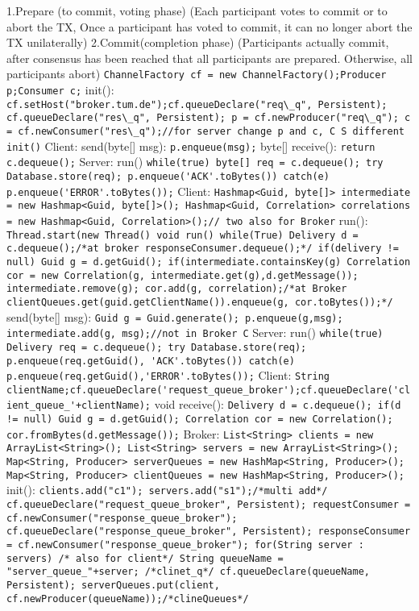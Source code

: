 1.Prepare (to commit, voting phase)
(Each participant votes to commit or to abort the TX,
Once a participant has voted to commit, it can no longer abort the TX unilaterally)
2.Commit(completion phase)
(Participants actually commit, after consensus has been reached that all participants are prepared.
Otherwise, all participants abort)
 \lstinline{ChannelFactory cf = new ChannelFactory();Producer p;Consumer c;}
init():  
\lstinline{cf.setHost("broker.tum.de");cf.queueDeclare("req\_q", Persistent); cf.queueDeclare("res\_q", Persistent); p = cf.newProducer("req\_q"); c = cf.newConsumer("res\_q");//for server change p and c, C S different init()}
 Client: 
send(byte[] msg):
\lstinline{p.enqueue(msg);}
byte[] receive():
\lstinline{return c.dequeue();}
\textbar Server: run()
\lstinline{while(true) byte[] req = c.dequeue(); try Database.store(req); p.enqueue('ACK'.toBytes()) catch(e) p.enqueue('ERROR'.toBytes());}
Client:
\lstinline{Hashmap<Guid, byte[]> intermediate = new Hashmap<Guid, byte[]>(); Hashmap<Guid, Correlation> correlations = new Hashmap<Guid, Correlation>();// two also for Broker}
run():
\lstinline{Thread.start(new Thread() void run() while(True) Delivery d = c.dequeue();/*at broker responseConsumer.dequeue();*/ if(delivery != null) Guid g = d.getGuid(); if(intermediate.containsKey(g) Correlation cor = new Correlation(g, intermediate.get(g),d.getMessage()); intermediate.remove(g); cor.add(g, correlation);/*at Broker clientQueues.get(guid.getClientName()).enqueue(g, cor.toBytes());*/}
send(byte[] msg):
\lstinline{Guid g = Guid.generate(); p.enqueue(g,msg); intermediate.add(g, msg);//not in Broker C}
\textbar Server: run()
\lstinline{while(true) Delivery req = c.dequeue(); try Database.store(req); p.enqueue(req.getGuid(), 'ACK'.toBytes()) catch(e) p.enqueue(req.getGuid(),'ERROR'.toBytes());}
Client: \lstinline{String clientName;cf.queueDeclare('request_queue_broker');cf.queueDeclare('client_queue_'+clientName);}
void receive():
\lstinline{Delivery d = c.dequeue(); if(d != null) Guid g = d.getGuid(); Correlation cor = new Correlation(); cor.fromBytes(d.getMessage());}
\textbar Broker:
\lstinline{List<String> clients = new ArrayList<String>(); List<String> servers = new ArrayList<String>(); Map<String, Producer> serverQueues = new HashMap<String, Producer>(); Map<String, Producer> clientQueues = new HashMap<String, Producer>();}
init():
\lstinline{clients.add("c1"); servers.add("s1");/*multi add*/ cf.queueDeclare("request_queue_broker", Persistent); requestConsumer = cf.newConsumer("response_queue_broker"); cf.queueDeclare("response_queue_broker", Persistent); responseConsumer = cf.newConsumer("response_queue_broker"); for(String server : servers) /* also for client*/ String queueName = "server_queue_"+server; /*clinet_q*/ cf.queueDeclare(queueName, Persistent); serverQueues.put(client, cf.newProducer(queueName));/*clineQueues*/}
